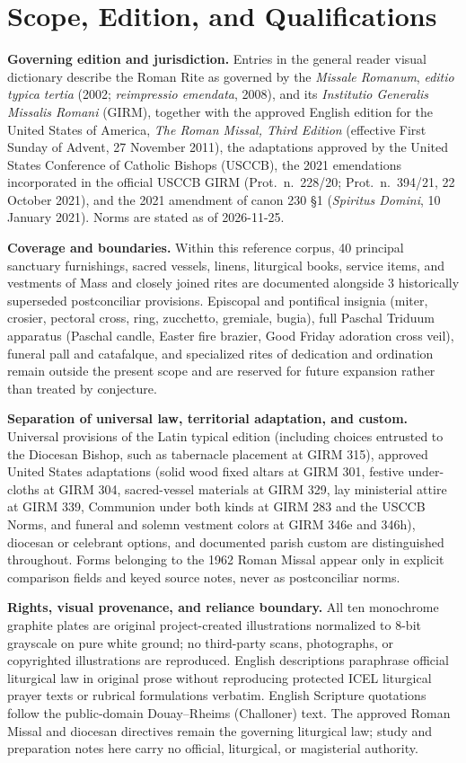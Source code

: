 \clearpage
\section{Scope, Edition, and Qualifications}
\textbf{Governing edition and jurisdiction.} Entries in the general reader visual dictionary describe the Roman Rite as governed by the \textit{Missale Romanum}, \textit{editio typica tertia} (2002; \textit{reimpressio emendata}, 2008), and its \textit{Institutio Generalis Missalis Romani} (GIRM), together with the approved English edition for the United States of America, \textit{The Roman Missal, Third Edition} (effective First Sunday of Advent, 27 November 2011), the adaptations approved by the United States Conference of Catholic Bishops (USCCB), the 2021 emendations incorporated in the official USCCB GIRM (Prot.~n.~228/20; Prot.~n.~394/21, 22 October 2021), and the 2021 amendment of canon 230 \S1 (\textit{Spiritus Domini}, 10 January 2021). Norms are stated as of 2026-11-25.

\textbf{Coverage and boundaries.} Within this reference corpus, 40 principal sanctuary furnishings, sacred vessels, linens, liturgical books, service items, and vestments of Mass and closely joined rites are documented alongside 3 historically superseded postconciliar provisions. Episcopal and pontifical insignia (miter, crosier, pectoral cross, ring, zucchetto, gremiale, bugia), full Paschal Triduum apparatus (Paschal candle, Easter fire brazier, Good Friday adoration cross veil), funeral pall and catafalque, and specialized rites of dedication and ordination remain outside the present scope and are reserved for future expansion rather than treated by conjecture.

\textbf{Separation of universal law, territorial adaptation, and custom.} Universal provisions of the Latin typical edition (including choices entrusted to the Diocesan Bishop, such as tabernacle placement at GIRM 315), approved United States adaptations (solid wood fixed altars at GIRM 301, festive under-cloths at GIRM 304, sacred-vessel materials at GIRM 329, lay ministerial attire at GIRM 339, Communion under both kinds at GIRM 283 and the USCCB Norms, and funeral and solemn vestment colors at GIRM 346e and 346h), diocesan or celebrant options, and documented parish custom are distinguished throughout. Forms belonging to the 1962 Roman Missal appear only in explicit comparison fields and keyed source notes, never as postconciliar norms.

\textbf{Rights, visual provenance, and reliance boundary.} All ten monochrome graphite plates are original project-created illustrations normalized to 8-bit grayscale on pure white ground; no third-party scans, photographs, or copyrighted illustrations are reproduced. English descriptions paraphrase official liturgical law in original prose without reproducing protected ICEL liturgical prayer texts or rubrical formulations verbatim. English Scripture quotations follow the public-domain Douay--Rheims (Challoner) text. The approved Roman Missal and diocesan directives remain the governing liturgical law; study and preparation notes here carry no official, liturgical, or magisterial authority.

